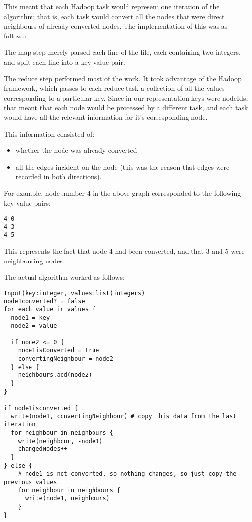 This meant that each Hadoop task would represent one iteration of the algorithm; that is, each task would convert all the nodes that were direct neighbours of already converted nodes. The implementation of this was as follows:

The map step merely parsed each line of the file, each containing two integers, and split each line into a key-value pair.

The reduce step performed most of the work. It took advantage of the Hadoop framework, which passes to each reduce task a collection of all the values corresponding to a particular key. Since in our representation keys were nodeIds, that meant that each node would be processed by a different task, and each task would have all the relevant information for it's corresponding node.

This information consisted of:
\begin{itemize}
\item whether the node was already converted
\item all the edges incident on the node (this was the reason that edges were recorded in both directions).
\end{itemize}

For example, node number 4 in the above graph corresponded to the following key-value pairs:

\begin{verbatim}
4 0
4 3
4 5
\end{verbatim}

This represents the fact that node 4 had been converted, and that 3 and 5 were neighbouring nodes.

The actual algorithm worked as follows:

\begin{verbatim}
Input(key:integer, values:list(integers)
node1converted? = false
for each value in values {
  node1 = key
  node2 = value

  if node2 <= 0 {
    node1isConverted = true
    convertingNeighbour = node2
  } else {
    neighbours.add(node2)
  }
}

if node1isconverted {
  write(node1, convertingNeighbour) # copy this data from the last iteration
  for neighbour in neighbours {
    write(neighbour, -node1)
    changedNodes++
  } 
} else {
    # node1 is not converted, so nothing changes, so just copy the previous values
    for neighbour in neighbours {
      write(node1, neighbours)
    }            
}
\end{verbatim}

